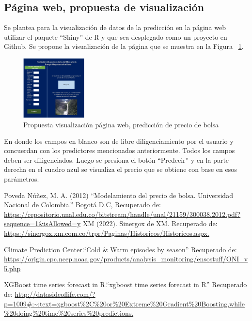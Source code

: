 \documentclass[conference, 10pt]{IEEEtran}
\begin{document}
\subsection{Página web, propuesta de visualización} \label{sec:web}
Se plantea para la visualización de datos de la predicción en la página web utilizar el paquete ``Shiny'' de R y que sea desplegado como un proyecto en Github. Se propone la visualización de la página que se muestra en la Figura ~\ref{fig1}.
\begin{figure}[htbp]
\centerline{\includegraphics[width=0.3\textwidth]{../Images/Propuesta_webpage.PNG}}
\caption{Propuesta visualización página web, predicción de precio de bolsa}
\label{fig1}
\end{figure}

En donde los campos en blanco son de libre diligenciamiento por el usuario y concuerdan con los predictores mencionados anteriormente. Todos los campos deben ser diligenciados. Luego se presiona el botón ``Predecir'' y en la parte derecha en el cuadro azul se visualiza el precio que se obtiene con base en esos parámetros.

\nocite{*}



\begin{thebibliography}{00}
 Poveda Núñez, M. A. (2012) “Modelamiento del precio de bolsa. Universidad Nacional de Colombia.” Bogotá D.C, Recuperado de: \url{https://repositorio.unal.edu.co/bitstream/handle/unal/21159/300038.2012.pdf?sequence=1&isAllowed=y}
 XM (2022). Sinergox de XM. Recuperado de: \url{ https://sinergox.xm.com.co/trpr/Paginas/Historicos/Historicos.aspx.} 

Climate Prediction Center.“Cold \& Warm episodes by season” Recuperado de: \url{https://origin.cpc.ncep.noaa.gov/products/analysis_monitoring/ensostuff/ONI_v5.php}

XGBoost time series forecast in R.“xgboost time series forecast in R” Recuperado de: \url{http://datasideoflife.com/?p=1009#:~:text=xgboost\%2C\%20or\%20Extreme\%20Gradient\%20Boosting,while\%20doing\%20time\%20series\%20predictions.}

\end{thebibliography}
\end{document}
